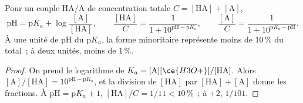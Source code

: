 \begin{proposition}\label{prop:b1:predominant-reaction:henderson}
Pour un couple HA/A de concentration totale $C = [\mathrm{HA}] + [\mathrm{A}]$,
\[
  \mathrm{pH} = \mathrm{p}K_a + \log\frac{[\mathrm{A}]}{[\mathrm{HA}]}, \qquad
  \frac{[\mathrm{HA}]}{C} = \frac{1}{1 + 10^{\mathrm{pH} - \mathrm{p}K_a}}, \qquad
  \frac{[\mathrm{A}]}{C} = \frac{1}{1 + 10^{\mathrm{p}K_a - \mathrm{pH}}} .
\]
À une unité de pH du $\mathrm{p}K_a$, la forme minoritaire représente
moins de 10\,\% du total~; à deux unités, moins de 1\,\%.
\end{proposition}

\begin{proof}
On prend le logarithme de $K_a = [\mathrm{A}][\ce{H3O+}]/[\mathrm{HA}]$.
Alors
$[\mathrm{A}]/[\mathrm{HA}] = 10^{\mathrm{pH}-\mathrm{p}K_a}$, et la
division de
$[\mathrm{HA}]$ par $[\mathrm{HA}] + [\mathrm{A}]$ donne les fractions. À
$\mathrm{pH} = \mathrm{p}K_a + 1$, $[\mathrm{HA}]/C = 1/11 < 10\,\%$~; à
$+2$, $1/101$.
\end{proof}

